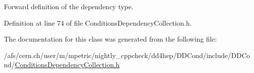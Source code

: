 Forward definition of the dependency type. 

Definition at line 74 of file ConditionsDependencyCollection.h.

The documentation for this class was generated from the following file:\begin{DoxyCompactItemize}
\item 
/afs/cern.ch/user/m/mpetric/nightly\_\-cppcheck/dd4hep/DDCond/include/DDCond/\hyperlink{_conditions_dependency_collection_8h}{ConditionsDependencyCollection.h}\end{DoxyCompactItemize}
